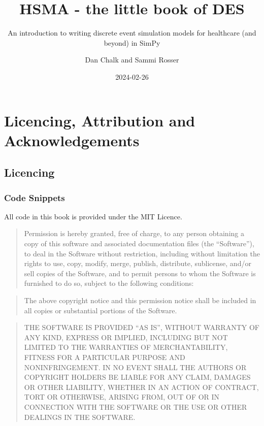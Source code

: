 \documentclass[
  letterpaper,
  DIV=11,
  numbers=noendperiod]{scrreprt}
\title{HSMA - the little book of DES}
\subtitle{An introduction to writing discrete event simulation models
for healthcare (and beyond) in SimPy}
\author{Dan Chalk and Sammi Rosser}
\date{2024-02-26}
\renewcommand*\contentsname{Table of contents}
\newcommand\contentsname{Table of contents}
\begin{document}
\maketitle

\renewcommand*\contentsname{Table of contents}
{
\hypersetup{linkcolor=}
\setcounter{tocdepth}{1}
\tableofcontents
}

\chapter*{Licencing, Attribution and
Acknowledgements}\label{licencing-attribution-and-acknowledgements}


\section*{Licencing}\label{licencing}


\subsection*{Code Snippets}\label{code-snippets}

All code in this book is provided under the MIT Licence.

\begin{quote}
Permission is hereby granted, free of charge, to any person obtaining a
copy of this software and associated documentation files (the
``Software''), to deal in the Software without restriction, including
without limitation the rights to use, copy, modify, merge, publish,
distribute, sublicense, and/or sell copies of the Software, and to
permit persons to whom the Software is furnished to do so, subject to
the following conditions:
\end{quote}

\begin{quote}
The above copyright notice and this permission notice shall be included
in all copies or substantial portions of the Software.
\end{quote}

\begin{quote}
THE SOFTWARE IS PROVIDED ``AS IS'', WITHOUT WARRANTY OF ANY KIND,
EXPRESS OR IMPLIED, INCLUDING BUT NOT LIMITED TO THE WARRANTIES OF
MERCHANTABILITY, FITNESS FOR A PARTICULAR PURPOSE AND NONINFRINGEMENT.
IN NO EVENT SHALL THE AUTHORS OR COPYRIGHT HOLDERS BE LIABLE FOR ANY
CLAIM, DAMAGES OR OTHER LIABILITY, WHETHER IN AN ACTION OF CONTRACT,
TORT OR OTHERWISE, ARISING FROM, OUT OF OR IN CONNECTION WITH THE
SOFTWARE OR THE USE OR OTHER DEALINGS IN THE SOFTWARE.
\end{quote}
\end{document}
